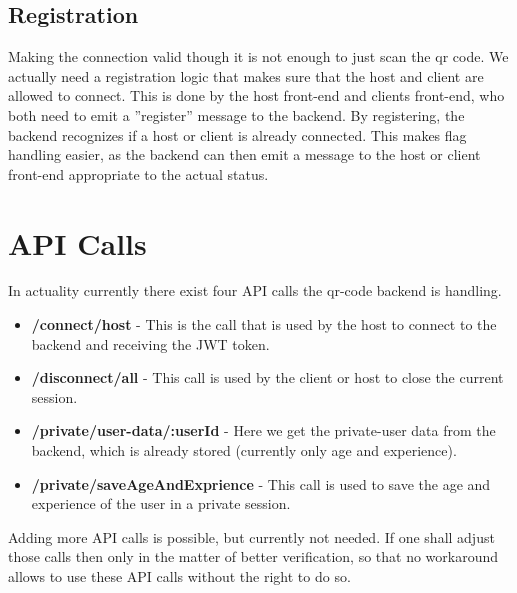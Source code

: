 \subsection{Registration}
Making the connection valid though it is not enough to just scan the qr code.
We actually need a registration logic that makes sure that the host and client are allowed to connect.
This is done by the host front-end and clients front-end, who both need to emit a ''register'' message to the backend.
By registering, the backend recognizes if a host or client is already connected.
This makes flag handling easier, as the backend can then emit a message to the host or client front-end appropriate to the actual status.

\section{API Calls}
In actuality currently there exist four API calls the qr-code backend is handling.
\begin{itemize}
    \item \textbf{/connect/host} - This is the call that is used by the host to connect to the backend and receiving the JWT token.
    \item \textbf{/disconnect/all} - This call is used by the client or host to close the current session.
    \item \textbf{/private/user-data/:userId} - Here we get the private-user data from the backend, which is already stored (currently only age and experience).
    \item \textbf{/private/saveAgeAndExprience} - This call is used to save the age and experience of the user in a private session.
\end{itemize}
Adding more API calls is possible, but currently not needed.
If one shall adjust those calls then only in the matter of better verification, so that no workaround allows to use these API calls without the right to do so.